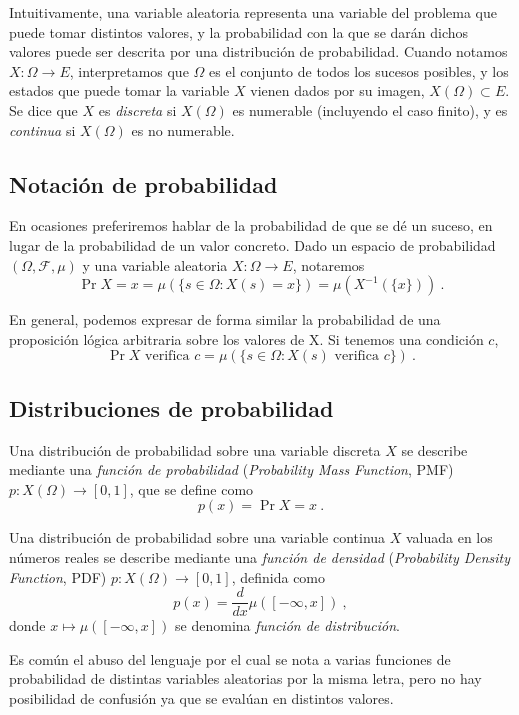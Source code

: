 Intuitivamente, una variable aleatoria representa una variable del
problema que puede tomar distintos valores, y la probabilidad con la que
se darán dichos valores puede ser descrita por una distribución de
probabilidad. Cuando notamos \(X:\Omega\rightarrow E\), interpretamos
que \(\Omega\) es el conjunto de todos los sucesos posibles, y los
estados que puede tomar la variable \(X\) vienen dados por su imagen,
\(X(\Omega)\subset E\). Se dice que \(X\) es \emph{discreta} si
\(X(\Omega)\) es numerable (incluyendo el caso finito), y es
\emph{continua} si \(X(\Omega)\) es no numerable.


\subsection{Notación de probabilidad}

En ocasiones preferiremos hablar de la probabilidad de que se dé un suceso, en lugar de la probabilidad de un valor concreto. Dado un espacio de probabilidad $(\Omega, \mathcal F, \mu)$ y una variable aleatoria $X:\Omega\rightarrow E$, notaremos
\[
  \Pr{X=x}=\mu(\{s\in\Omega:X(s)=x\})=\mu(X^{-1}(\{x\}))~.
\]

En general, podemos expresar de forma similar la probabilidad de una proposición lógica arbitraria sobre los valores de X. Si tenemos una condición $c$,
\[
  \Pr{X\mbox{ verifica }c}=\mu(\{s\in\Omega:X(s)\mbox{ verifica }c\})~.
\]


\subsection{Distribuciones de probabilidad}

Una distribución de probabilidad sobre una variable discreta \(X\) se
describe mediante una \emph{función de probabilidad} (\emph{Probability
  Mass Function}, PMF) \(p:X(\Omega)\rightarrow [0,1]\), que se define como
\[
  p(x)=\Pr{X=x}~.
\]

Una distribución de probabilidad sobre una variable continua \(X\) valuada en los números reales se
describe mediante una \emph{función de densidad} (\emph{Probability
  Density Function}, PDF) \(p:X(\Omega)\rightarrow [0,1]\), definida como
\[
  p(x)=\frac{d}{dx}\mu([-\infty,x])~,
\]
donde \(x\mapsto \mu([-\infty,x])\) se denomina \emph{función de distribución}.

Es común el abuso del lenguaje por el cual se nota a varias funciones de probabilidad de distintas variables aleatorias por la misma letra, pero no hay posibilidad de confusión ya que se evalúan en distintos valores.

